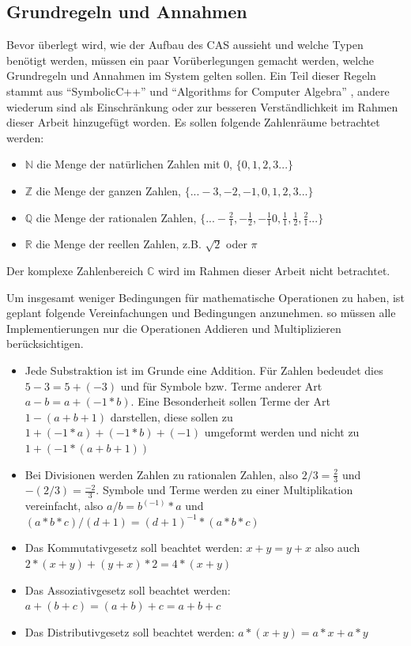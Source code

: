\documentclass[11pt,a4paper, ngerman]{article}
\begin{document}
\subsection{Grundregeln und Annahmen}
Bevor überlegt wird, wie der Aufbau des CAS aussieht und welche Typen benötigt werden, müssen ein paar Vorüberlegungen gemacht werden, welche Grundregeln und Annahmen im System gelten sollen. Ein Teil dieser Regeln stammt aus ``SymbolicC++'' \cite[S. 2]{Tan2000} und ``Algorithms for Computer Algebra'' \cite[S. 23 ff.]{Geddes2007}, andere wiederum sind als Einschränkung oder zur besseren Verständlichkeit im Rahmen dieser Arbeit hinzugefügt worden. Es sollen folgende Zahlenräume betrachtet werden:
\begin{itemize}
    \item $\mathbb{N}$ die Menge der natürlichen Zahlen mit 0, $\{0, 1, 2, 3...\}$
    \item $\mathbb{Z}$ die Menge der ganzen Zahlen, $\{...-3, -2, -1, 0, 1, 2, 3...\}$
    \item $\mathbb{Q}$ die Menge der rationalen Zahlen, $\{...-\frac{2}{1}, -\frac{1}{2}, -\frac{1}{1} 0, \frac{1}{1}, \frac{1}{2}, \frac{2}{1}...\}$
    \item $\mathbb{R}$ die Menge der reellen Zahlen, z.B. $\sqrt{2}$ oder $\pi$
\end{itemize}

Der komplexe Zahlenbereich  $\mathbb{C}$ wird im Rahmen dieser Arbeit nicht betrachtet.

Um insgesamt weniger Bedingungen für mathematische Operationen zu haben, ist geplant folgende Vereinfachungen und Bedingungen anzunehmen. so müssen alle Implementierungen nur die Operationen Addieren und Multiplizieren berücksichtigen.
\begin{itemize}
    \item Jede Substraktion ist im Grunde eine Addition. Für Zahlen bedeudet dies $5-3 = 5+(-3)$ und für Symbole bzw. Terme anderer Art $a-b = a+(-1 * b)$. Eine Besonderheit sollen Terme der Art $1-(a+b+1)$ darstellen, diese sollen zu $1+(-1*a)+(-1*b)+(-1)$ umgeformt werden und nicht zu $1+(-1*(a+b+1))$
    \item Bei Divisionen werden Zahlen zu rationalen Zahlen, also $2/3 = \frac{2}{3}$ und $-(2/3) = \frac{-2}{3}$. Symbole und Terme werden zu einer Multiplikation vereinfacht, also $a/b = b^{(-1)} * a$ und $(a*b*c)/(d+1) = (d+1)^{-1} * (a*b*c)$
    \item Das Kommutativgesetz soll beachtet werden: $x+y = y+x$ also auch $2*(x+y) + (y+x)*2 = 4*(x+y)$
    \item Das Assoziativgesetz soll beachtet werden: $a+(b+c) = (a+b)+c = a+b+c$
    \item Das Distributivgesetz soll beachtet werden: $a*(x+y) = a*x + a*y$
\end{itemize}
\end{document}
